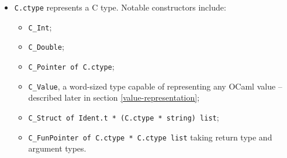 \documentclass[12pt,a4paper,twoside,openright]{report}
\begin{document}
\begin{itemize}
  \item
    \lstinline!C.ctype! represents a C type. Notable constructors include:

    \begin{itemize}
        \item \lstinline!C_Int!;
        \item \lstinline!C_Double!;
        \item \lstinline!C_Pointer of C.ctype!;
        \item \lstinline!C_Value!, a word-sized type capable of representing
          any OCaml value -- described later in section \ref{value-representation};
        \item \lstinline!C_Struct of Ident.t * (C.ctype * string) list!;
        \item \lstinline!C_FunPointer of C.ctype * C.ctype list! taking return
            type and argument types.
    \end{itemize}


\end{itemize}
\end{document}
